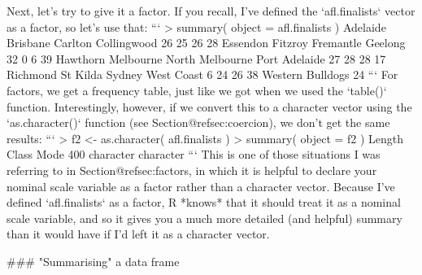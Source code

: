 Next, let's try to give it a factor. If you recall, I've defined the `afl.finalists` vector as a factor, so let's use that:
```
> summary( object = afl.finalists )
        Adelaide         Brisbane          Carlton      Collingwood 
              26               25               26               28 
        Essendon          Fitzroy        Fremantle          Geelong 
              32                0                6               39 
        Hawthorn        Melbourne  North Melbourne    Port Adelaide 
              27               28               28               17 
        Richmond         St Kilda           Sydney       West Coast 
               6               24               26               38 
Western Bulldogs 
              24 
```
For factors, we get a frequency table, just like we got when we used the `table()` function. Interestingly, however, if we convert this to a character vector using the `as.character()` function (see Section@refsec:coercion), we don't get the same results:
```
> f2 <- as.character( afl.finalists )
> summary( object = f2 )
   Length     Class      Mode 
      400 character character 
```
This is one of those situations I was referring to in Section@refsec:factors, in which it is helpful to declare your nominal scale variable as a factor rather than a character vector. Because I've defined `afl.finalists` as a factor, R *knows* that it should treat it as a nominal scale variable, and so it gives you a much more detailed (and helpful) summary than it would have if I'd left it as a character vector.



### "Summarising" a data frame

